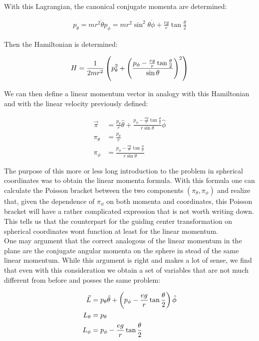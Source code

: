 With this Lagrangian, the canonical conjugate momenta are determined:

\begin{align*}
p_\theta = mr^2\dot{\theta}
p_\phi = mr^2\sin^2\theta\dot{\phi} + \frac{eg}{r}\tan{\frac{\theta}{2}}
\end{align*}

Then the Hamiltonian is determined:

\begin{equation}
H = \frac{1}{2mr^2}\left( p_\theta^2 + \left( \frac{p_\phi - \frac{eg}{r}\tan{\frac{\theta}{2}}}{\sin\theta} \right)^2 \right)
\end{equation}

We can then define a linear momentum vector in analogy with this Hamiltonian and with the linear velocity previously defined:

\begin{align*}
\vec{\pi} &= \frac{p_\theta}{r}\hat{\theta} + \frac{p_\phi - \frac{eg}{r}\tan{\frac{\theta}{2}}}{r\sin\theta}\hat{\phi}\\
\pi_\theta &= \frac{p_\theta}{r}\\
\pi_\phi &= \frac{p_\phi - \frac{eg}{r}\tan{\frac{\theta}{2}}}{r\sin\theta}
\end{align*}

The purpose of this more or less long introduction to the problem in spherical coordinates was to obtain the linear momenta formula. With this formula one can calculate the Poisson bracket between the two components $(\pi_\theta,\pi_\phi)$ and realize that, given the dependence of $\pi_\phi$ on both momenta and coordinates, this Poisson bracket will have a rather complicated expression that is not worth writing down. This tells us that the counterpart for the guiding center transformation on spherical coordinates wont function at least for the linear momentum. \\

One may argument that the correct analogous of the linear momentum in the plane are the conjugate angular momenta on the sphere in stead of the same linear momentum. While this argument is right and makes a lot of sense, we find that even with this consideration we obtain a set of variables that are not much different from before and posses the same problem:

\begin{align*}
\vec{L} &= p_\theta\hat{\theta} + \left( p_\phi - \frac{eg}{r}\tan{\frac{\theta}{2}} \right)\hat{\phi}\\
L_\theta &= p_\theta\\
L_\phi &= p_\phi - \frac{eg}{r}\tan{\frac{\theta}{2}}
\end{align*}

